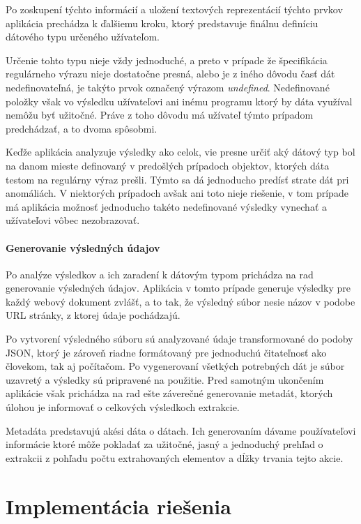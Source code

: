 Po zoskupení týchto informácií a uložení textových reprezentácií týchto prvkov aplikácia prechádza k ďalšiemu kroku, ktorý predstavuje finálnu definíciu  dátového typu určeného užívateľom.

\bigskip

Určenie tohto typu nieje vždy jednoduché, a preto v prípade že špecifikácia regulárneho výrazu nieje dostatočne presná, alebo je z iného dôvodu časť dát nedefinovateľná, je takýto prvok označený výrazom \textit{undefined}. Nedefinované položky však vo výsledku užívateľovi ani inému programu ktorý by dáta využíval nemôžu byť užitočné. Práve z toho dôvodu má užívateľ týmto prípadom predchádzať, a to dvoma spôsobmi. 

Keďže aplikácia analyzuje výsledky ako celok, vie presne určiť aký dátový typ bol na danom mieste definovaný v predošlých prípadoch objektov, ktorých dáta testom na regulárny výraz prešli. Týmto sa dá jednoducho predísť strate dát pri anomáliách. V niektorých prípadoch avšak ani toto nieje riešenie, v tom prípade má aplikácia možnosť jednoducho takéto nedefinované výsledky vynechať a užívateľovi vôbec nezobrazovať.

\newpage
\subsubsection{Generovanie výsledných údajov}

Po analýze výsledkov a ich zaradení k dátovým typom prichádza na rad generovanie výsledných údajov. Aplikácia v tomto prípade generuje výsledky pre každý webový dokument zvlášť, a to tak, že výsledný súbor nesie názov v podobe URL stránky, z ktorej údaje pochádzajú.

Po vytvorení výsledného súboru sú analyzované údaje transformované do podoby JSON, ktorý je zároveň riadne formátovaný pre jednoduchú čitateľnosť ako človekom, tak aj počítačom. Po vygenerovaní všetkých potrebných dát je súbor uzavretý a výsledky sú pripravené na použitie. Pred samotným ukončením aplikácie však prichádza na rad ešte záverečné generovanie metadát, ktorých úlohou je informovať o celkových výsledkoch extrakcie.

Metadáta predstavujú akési dáta o dátach. Ich generovaním dávame používateľovi informácie ktoré môže pokladať za užitočné, jasný a jednoduchý prehľad o extrakcii z pohľadu počtu extrahovaných elementov a dĺžky trvania tejto akcie.

\chapter{Implementácia riešenia}
\label{implementacia}

